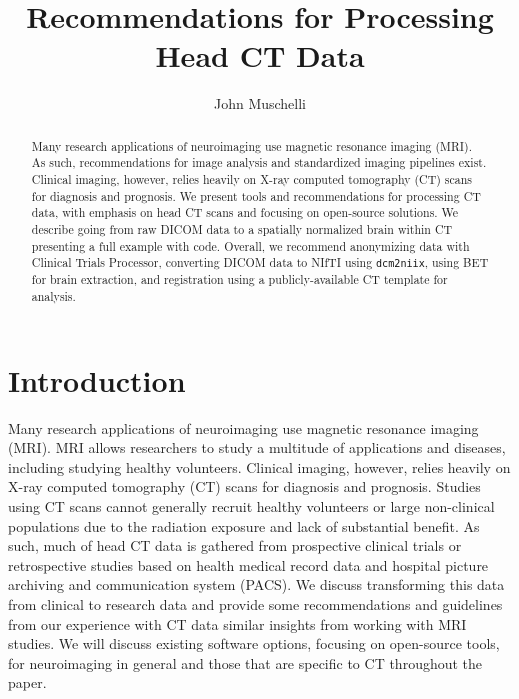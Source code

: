 \documentclass[]{elsarticle} %
\begin{document}
\begin{frontmatter}

  \title{Recommendations for Processing Head CT Data}
    \author[JHSPH]{John Muschelli}
  
      \address[JHSPH]{Johns Hopkins Bloomberg School of Public Health, Department of Biostatistics, 615 N Wolfe St, Baltimore, MD, 21205}
  
  \begin{abstract}
  Many research applications of neuroimaging use magnetic resonance imaging (MRI). As such, recommendations for image analysis and standardized imaging pipelines exist. Clinical imaging, however, relies heavily on X-ray computed tomography (CT) scans for diagnosis and prognosis. We present tools and recommendations for processing CT data, with emphasis on head CT scans and focusing on open-source solutions. We describe going from raw DICOM data to a spatially normalized brain within CT presenting a full example with code. Overall, we recommend anonymizing data with Clinical Trials Processor, converting DICOM data to NIfTI using \texttt{dcm2niix}, using BET for brain extraction, and registration using a publicly-available CT template for analysis.
  \end{abstract}
  
 \end{frontmatter}

\hypertarget{introduction}{%
\section{Introduction}\label{introduction}}

Many research applications of neuroimaging use magnetic resonance imaging (MRI). MRI allows researchers to study a multitude of applications and diseases, including studying healthy volunteers. Clinical imaging, however, relies heavily on X-ray computed tomography (CT) scans for diagnosis and prognosis. Studies using CT scans cannot generally recruit healthy volunteers or large non-clinical populations due to the radiation exposure and lack of substantial benefit. As such, much of head CT data is gathered from prospective clinical trials or retrospective studies based on health medical record data and hospital picture archiving and communication system (PACS). We discuss transforming this data from clinical to research data and provide some recommendations and guidelines from our experience with CT data similar insights from working with MRI studies. We will discuss existing software options, focusing on open-source tools, for neuroimaging in general and those that are specific to CT throughout the paper.
\end{document}
